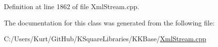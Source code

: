 Definition at line 1862 of file Xml\+Stream.\+cpp.



The documentation for this class was generated from the following file\+:\begin{DoxyCompactItemize}
\item 
C\+:/\+Users/\+Kurt/\+Git\+Hub/\+K\+Square\+Libraries/\+K\+K\+Base/\hyperlink{_xml_stream_8cpp}{Xml\+Stream.\+cpp}\end{DoxyCompactItemize}
